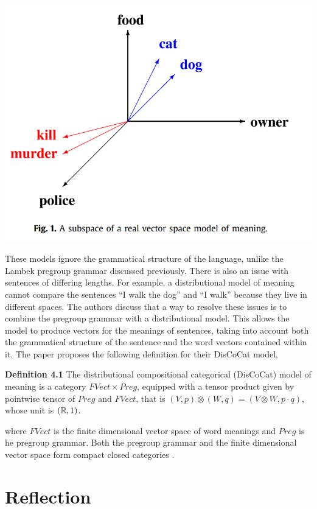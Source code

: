 \documentclass[11pt, reqno]{amsart}
\theoremstyle{plain}
\theoremstyle{definition}
\theoremstyle{example}
\begin{document}
\includegraphics[scale=0.7]{vector_space}

\par
These models ignore the grammatical structure of the language, unlike the Lambek pregroup grammar discussed previously. There is also an issue with sentences of differing lengths. For example, a distributional model of meaning cannot compare the sentences ``I walk the dog'' and ``I walk'' because they live in different spaces. The authors discuss that a way to resolve these issues is to combine the pregroup grammar with a distributional model. This allows the model to produce vectors for the meanings of sentences, taking into account both the grammatical structure of the sentence and the word vectors contained within it. The paper proposes the following definition for their DisCoCat model,

\par
\textbf{Definition 4.1} \cite{lambekvlambek} The distributional compositional categorical (DisCoCat) model of meaning is a category $FVect \times Preg$, equipped with a tensor product given by pointwise tensor of $Preg$ and $FVect$, that is $(V, p) \otimes (W, q) = (V \otimes W, p \cdot q)$, whose unit is $(\mathbb{R}, 1)$.

\par
where $FVect$ is the finite dimensional vector space of word meanings and $Preg$ is he pregroup grammar. Both the pregroup grammar and the finite dimensional vector space form compact closed categories \cite{lambekvlambek}.

\section{Reflection}
\end{document}
